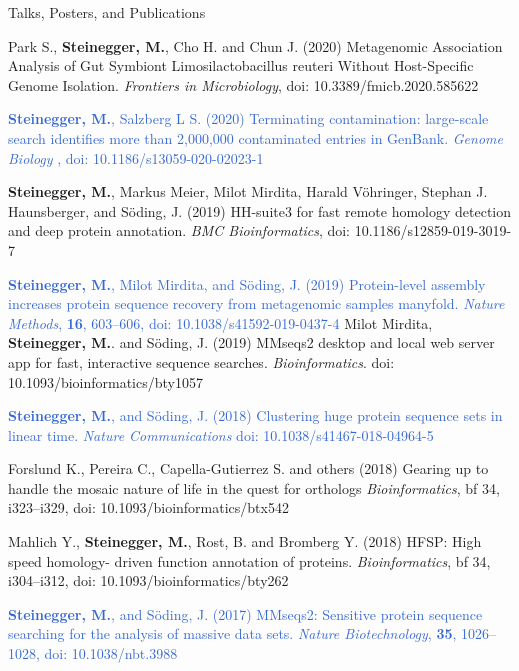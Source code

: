 \documentclass{resume} %
\begin{document}
\begin{rSection}{Talks, Posters, and Publications}
\begin{thebibliography}{10}
Park S., {\bf Steinegger, M.}, Cho H. and Chun J. (2020)
Metagenomic Association Analysis of Gut Symbiont Limosilactobacillus reuteri Without Host-Specific Genome Isolation. {\em Frontiers in Microbiology},  doi: 10.3389/fmicb.2020.585622

\textcolor{highlight}{
{\bf Steinegger, M.}, Salzberg L S. (2020)
Terminating contamination: large-scale search identifies more than 2,000,000 contaminated entries in GenBank. {\em Genome Biology },  doi: 10.1186/s13059-020-02023-1
}

\newpage

{\bf Steinegger, M.}, Markus Meier, Milot Mirdita, Harald V\"ohringer, Stephan J. Haunsberger, and S\"oding, J. (2019)
HH-suite3 for fast remote homology detection and deep protein annotation. {\em BMC Bioinformatics},  doi: 10.1186/s12859-019-3019-7

\textcolor{highlight}{
{\bf Steinegger, M.}, Milot Mirdita, and S\"oding, J. (2019)
Protein-level assembly increases protein sequence recovery from metagenomic samples manyfold. {\em Nature Methods}, {\bf 16}, 603–606, doi: 10.1038/s41592-019-0437-4 
}
Milot Mirdita, {\bf Steinegger, M.}. and S\"oding, J. (2019) MMseqs2 desktop and local web server app for fast, interactive sequence searches. {\em Bioinformatics}. doi: 10.1093/bioinformatics/bty1057

\textcolor{highlight}{
{\bf Steinegger, M.}, and S\"oding, J. (2018)
Clustering huge protein sequence sets in linear time.
{\em Nature Communications} doi: 10.1038/s41467-018-04964-5}

Forslund K., Pereira C., Capella-Gutierrez S. and others (2018) 
Gearing up to handle the mosaic nature of life in the quest for orthologs {\em Bioinformatics}, {bf 34}, i323–i329, doi: 10.1093/bioinformatics/btx542

Mahlich Y., {\bf Steinegger, M.}, Rost, B. and Bromberg Y. (2018) HFSP: High speed homology- driven function annotation of proteins. {\em Bioinformatics}, {bf 34}, i304–i312, doi: 10.1093/bioinformatics/bty262

\textcolor{highlight}{
{\bf Steinegger, M.}, and S\"oding, J. (2017)
MMseqs2: Sensitive protein sequence searching for the analysis of massive data sets.
{\em Nature Biotechnology}, {\bf  35}, 1026–1028, doi: 10.1038/nbt.3988}


\end{thebibliography}
\end{rSection}
\end{document}
